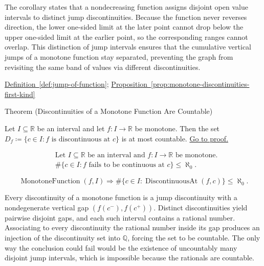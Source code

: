 \begin{remark*}[Interpretation]
The corollary states that a nondecreasing function assigns disjoint open value intervals to distinct jump discontinuities. Because the function never reverses direction, the lower one-sided limit at the later point cannot drop below the upper one-sided limit at the earlier point, so the corresponding ranges cannot overlap. This distinction of jump intervals ensures that the cumulative vertical jumps of a monotone function stay separated, preventing the graph from revisiting the same band of values via different discontinuities.
\end{remark*}

\begin{remark*}[Dependencies]
\hyperref[def:jump-of-function]{Definition~\ref*{def:jump-of-function}}; \hyperref[prop:monotone-discontinuities-first-kind]{Proposition~\ref*{prop:monotone-discontinuities-first-kind}}
\end{remark*}

\begin{theorembox}{Theorem (Discontinuities of a Monotone Function Are Countable)}
\begin{theorem}
\label{thm:monotone-discontinuities-countable}
Let $I \subseteq \mathbb{R}$ be an interval and let $f:I\to\mathbb{R}$ be monotone. Then the set $D_f \coloneqq \{c \in I : f \text{ is discontinuous at } c\}$ is at most countable. \hyperref[prf:monotone-discontinuities-countable]{Go to proof.}
\end{theorem}
\end{theorembox}

\begin{remark*}
\[
\begin{aligned}
&\text{Let } I \subseteq \mathbb{R} \text{ be an interval and } f:I\to\mathbb{R} \text{ be monotone}.\\
&\#\{c \in I : f \text{ fails to be continuous at } c\} \le \aleph_0.
\end{aligned}
\]
\end{remark*}

\begin{remark*}
\[
\operatorname{MonotoneFunction}(f,I) \Longrightarrow \#\{c \in I : \operatorname{DiscontinuousAt}(f,c)\} \le \aleph_0.
\]
\end{remark*}

\begin{remark*}[Interpretation]
Every discontinuity of a monotone function is a jump discontinuity with a nondegenerate vertical gap $(f(c^-),f(c^+))$. Distinct discontinuities yield pairwise disjoint gaps, and each such interval contains a rational number. Associating to every discontinuity the rational number inside its gap produces an injection of the discontinuity set into $\mathbb{Q}$, forcing the set to be countable. The only way the conclusion could fail would be the existence of uncountably many disjoint jump intervals, which is impossible because the rationals are countable.
\end{remark*}

